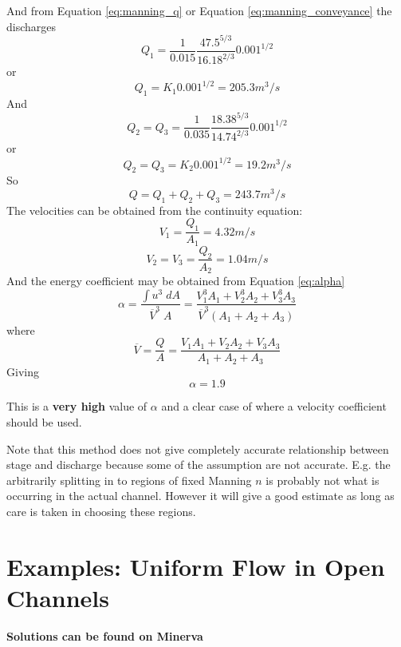 \documentclass[a4paper, 12pt, british]{article} %
\numberwithin{equation}{section}
\numberwithin{figure}{section}
\numberwithin{table}{section}
\begin{document}
And from Equation \ref{eq:manning_q} or Equation \ref{eq:manning_conveyance}
the discharges
\begin{equation*}
Q_1 = \frac{1}{0.015}\frac{47.5^{5/3}}{16.18^{2/3}}0.001^{1/2}
\end{equation*}
or
\begin{equation*}
Q_1 = K_1 0.001^{1/2}= 205.3 m^3/s
\end{equation*}
And
\begin{equation*}
Q_2 = Q_3 = \frac{1}{0.035}\frac{18.38^{5/3}}{14.74^{2/3}}0.001^{1/2}
\end{equation*}
or
\begin{equation*}
Q_2=Q_3 = K_2 0.001^{1/2}= 19.2 m^3/s
\end{equation*}
So
\begin{equation*}
Q = Q_1 + Q_2 + Q_3 = 243.7 m^3/s
\end{equation*}
The velocities can be obtained from the continuity equation:
\begin{equation*}
V_1 = \frac{Q_1}{A_1} = 4.32 m/s
\end{equation*}
\begin{equation*}
V_2 = V_3 = \frac{Q_2}{A_2} = 1.04 m/s
\end{equation*}
And the energy coefficient may be obtained from Equation \ref{eq:alpha}
\begin{equation*}
\alpha = \frac{\int u^3 \; dA}{\overline{V}^3 \; A} = \frac{V_1^3 A_1+ V_2^3 A_2+V_3^3 A_3}{\overline{V}^3(A_1+A_2+A_3)} 
\end{equation*}
where
\begin{equation*}
\overline{V} = \frac{Q}{A} = \frac{V_1 A_1+ V_2 A_2+V_3 A_3}{A_1+A_2+A_3} 
\end{equation*} 
Giving 
\begin{equation*}
\alpha = 1.9
\end{equation*}


This is a \textbf{very high} value of $\alpha$ and a clear case of where a velocity coefficient should be used.

Note that this method does not give completely accurate relationship between stage and discharge because some of the assumption are not accurate. E.g. the arbitrarily splitting in to regions of fixed Manning $n$ is probably not what is occurring in the actual channel. However it will give a good estimate as long as care is taken in choosing these regions.

\section{Examples: Uniform Flow in Open Channels}
\textbf{Solutions can be found on Minerva}
\end{document}
